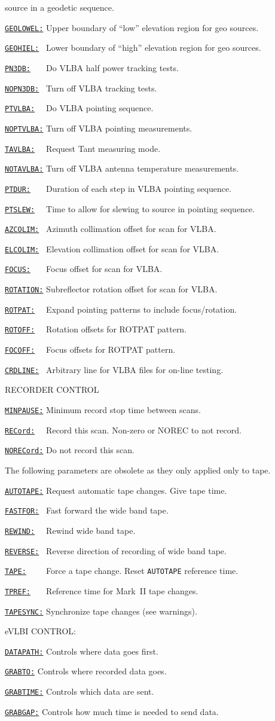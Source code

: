 \documentclass{report}
\newcommand{\htlm}[2]%
{\item
  \hyperref[MP:#1]{{\tt #1:}}{\tt #2}%
}
\newcommand{\htln}[3]%
{\item
  \hyperref[MP:#2]{{\tt #1:}}{\tt #3}%
}
\begin{document}
\begin{list}{}{\parsep 0em  \itemsep 0em }
                     source in a geodetic sequence.
\htlm{GEOLOWEL}{} Upper boundary of ``low'' elevation region for geo sources.
\htlm{GEOHIEL}{~} Lower boundary of ``high'' elevation region for geo sources.
\htlm{PN3DB}{~~~}  Do VLBA half power tracking tests.
\htln{NOPN3DB}{PTVLBA}{~} Turn off VLBA tracking tests.
\htlm{PTVLBA}{~~} Do VLBA pointing sequence.
\htln{NOPTVLBA}{PTVLBA}{} Turn off VLBA pointing measurements.
\htlm{TAVLBA}{~~} Request Tant measuring mode.
\htln{NOTAVLBA}{TAVLBA}{} Turn off VLBA antenna temperature measurements.
\htlm{PTDUR}{~~~} Duration of each step in VLBA pointing
                        sequence.
\htlm{PTSLEW}{~~} Time to allow for slewing to source in
                        pointing sequence.
\htlm{AZCOLIM}{~} Azimuth collimation offset for scan for VLBA.
\htlm{ELCOLIM}{~} Elevation collimation offset for scan for VLBA.
\htlm{FOCUS}{~~~} Focus offset for scan for VLBA.
\htlm{ROTATION}{} Subreflector rotation offset for scan for VLBA.
\htlm{ROTPAT}{~~} Expand pointing patterns to include focus/rotation.
\htlm{ROTOFF}{~~} Rotation offsets for ROTPAT pattern.
\htlm{FOCOFF}{~~} Focus offsets for ROTPAT pattern.
\htlm{CRDLINE}{~} Arbitrary line for VLBA files for on-line testing.
\end{list}

RECORDER CONTROL

\begin{list}{}{\parsep 0em  \itemsep 0em }
\htlm{MINPAUSE}{} Minimum record stop time between scans.
\htln{RECord}{RECORD}{~~} Record this scan. Non-zero or NOREC to not record.
\htln{NORECord}{RECORD}{} Do not record this scan.
\end{list}

The following parameters are obsolete as they only applied only to tape.

\begin{list}{}{\parsep 0em  \itemsep 0em }
\htlm{AUTOTAPE}{} Request automatic tape changes. Give tape time.
\htlm{FASTFOR}{~} Fast forward the wide band tape.
\htlm{REWIND}{~~} Rewind wide band tape.
\htlm{REVERSE}{~} Reverse direction of recording of wide band tape.
\htlm{TAPE}{~~~~} Force a tape change. Reset {\tt AUTOTAPE}
                        reference time.
\htlm{TPREF}{~~~} Reference time for Mark~II tape changes.
\htlm{TAPESYNC}{} Synchronize tape changes (see warnings).
\end{list}

eVLBI CONTROL:

\begin{list}{}{\parsep 0em  \itemsep 0em }
\htlm{DATAPATH}{} Controls where data goes first.
\htlm{GRABTO}{} Controls where recorded data goes.
\htlm{GRABTIME}{} Controls which data are sent.
\htlm{GRABGAP}{} Controls how much time is needed to send data.
\end{list}
\end{document}

